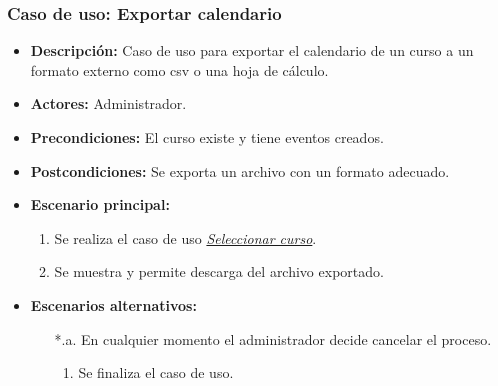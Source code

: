 \documentclass{book}
\begin{document}
\subsubsection*{Caso de uso: Exportar calendario}
\begin{itemize}
\item{\bf Descripción:} Caso de uso para exportar el calendario de un curso a un formato externo como csv o una hoja de cálculo.
\item{\bf Actores:} Administrador.
\item{\bf Precondiciones:} El curso existe y tiene eventos creados.
\item{\bf Postcondiciones:} Se exporta un archivo con un formato adecuado.
\item{\bf Escenario principal:}
	\begin{enumerate}
	\item Se realiza el caso de uso {\em \hyperref[select_curso]{Seleccionar curso}}.
	\item Se muestra y permite descarga del archivo exportado.
	\end{enumerate}
\item{\bf Escenarios alternativos:}
	\begin{itemize}
		\item[*.a.] En cualquier momento el administrador decide cancelar el proceso.
		\begin{enumerate}
			\item Se finaliza el caso de uso.
		\end{enumerate}
	\end{itemize}
\end{itemize}
\end{document}
